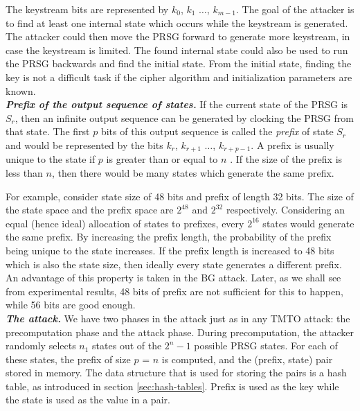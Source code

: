 The keystream bits are represented by $k_0$, $k_1$ $\ldots$, $k_{m-1}$. The goal of the attacker is to find at least one internal state which occurs while the keystream is generated. The attacker could then move the PRSG forward to generate more keystream, in case the keystream is limited. The found internal state could also be used to run the PRSG backwards and find the initial state. From the initial state, finding the key is not a difficult task if the cipher algorithm and initialization parameters are known.\\

\noindent \textit{\textbf{Prefix of the output sequence of states.}} If the current state of the PRSG is $S_r$, then an infinite output sequence can be generated by clocking the PRSG from that state. The first $p$ bits of this output sequence is called the \textit{prefix} of state $S_r$ and would be represented by the bits $k_r$, $k_{r+1}$ $\ldots$, $k_{r+p-1}$. A prefix is usually unique to the state if $p$ is greater than or equal to $n$ \cite{biryukov2000rtc}. If the size of the prefix is less than $n$, then there would be many states which generate the same prefix. 

For example, consider state size of 48 bits and prefix of length 32 bits. The size of the state space and the prefix space are $2^{48}$ and $2^{32}$ respectively. Considering an equal (hence ideal) allocation of states to prefixes, every $2^{16}$ states would generate the same prefix. By increasing the prefix length, the probability of the prefix being unique to the state increases. If the prefix length is increased to 48 bits which is also the state size, then ideally every state generates a different prefix. An advantage of this property is taken in the BG attack. Later, as we shall see from experimental results, 48 bits of prefix are not sufficient for this to happen, while 56 bits are good enough.\\

\noindent \textit{\textbf{The attack.}} We have two phases in the attack just as in any TMTO attack: the precomputation phase and the attack phase. During precomputation, the attacker randomly selects $n_1$ states out of the $2^n - 1$ possible PRSG states. For each of these states, the prefix of size $p$ = $n$ is computed, and the (prefix, state) pair stored in memory. The data structure that is used for storing the pairs is a hash table, as introduced in section \ref{sec:hash-tables}. Prefix is used as the key while the state is used as the value in a pair.

